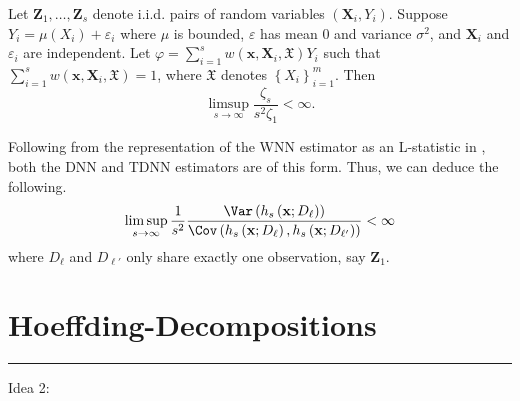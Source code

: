 \begin{thm}
	Let $\mathbf{Z}_1, \ldots, \mathbf{Z}_s$ denote i.i.d. pairs of random variables $\left(\mathbf{X}_i, Y_i\right)$.
	Suppose $Y_i=\mu\left(X_i\right)+\varepsilon_i$ where $\mu$ is bounded, $\varepsilon$ has mean 0 and variance $\sigma^2$, and $\mathbf{X}_i$ and $\varepsilon_i$ are independent.
	Let $\varphi=\sum_{i=1}^s w(\mathbf{x}, \mathbf{X}_i, \mathfrak{X}) Y_i$ such that $\sum_{i=1}^s w(\mathbf{x}, \mathbf{X}_i, \mathfrak{X})=1$, where $\mathfrak{X}$ denotes $\left\{X_i\right\}_{i=1}^m$.
	Then
	\begin{equation}
		\limsup _{s \rightarrow \infty} \frac{\zeta_s}{s^2 \zeta_1}
		< \infty.
	\end{equation}
\end{thm}

Following from the representation of the WNN estimator as an L-statistic in \citet{steele_exact_2009}, both the DNN and TDNN estimators are of this form.
Thus, we can deduce the following.
\begin{equation}
	\limsup _{s \rightarrow \infty} \frac{1}{s^2} \frac{\Var\left(h_{s}\left(\mathbf{x}; D_{\ell}\right)\right)}{\Cov\left(h_s\left(\mathbf{x}; D_{\ell}\right), h_s\left(\mathbf{x}; D_{\ell'}\right)\right)}
	< \infty
\end{equation}
where $D_{\ell}$ and $D_{\ell'}$ only share exactly one observation, say $\mathbf{Z}_1$.

\section{Hoeffding-Decompositions}



\hrule

{\color{red} Idea 2:}

